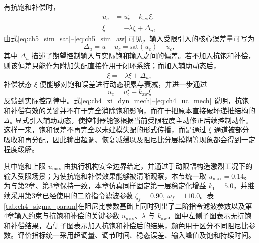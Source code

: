有抗饱和补偿时，
\begin{subequations}\label{eq:ch5_sim_aw}
\begin{align}
u_c&=u_c^\star-k_{\mathrm{aw}}\xi,\\
\dot\xi&=-\lambda\xi+\Delta_u,
\end{align}
\end{subequations}
由式\eqref{eq:ch5_sim_sat}--\eqref{eq:ch5_sim_aw} 可见，输入受限引入的核心误差量可写为
\begin{equation}\label{eq:ch4_delta_u}
\Delta_u=u-u_c=\mathrm{sat}(u_c)-u_c,
\end{equation}
其中 $\Delta_u$ 描述了期望控制输入与实际饱和输入之间的偏差。若不加入抗饱和补偿，则该偏差只能作为附加失配直接作用于闭环系统；而加入辅助动态后，
\begin{equation}\label{eq:ch4_xi_dyn_mech}
\dot\xi=-\lambda\xi+\Delta_u,
\end{equation}
补偿状态 $\xi$ 便能够对饱和误差进行动态积累与衰减，并进一步通过
\begin{equation}\label{eq:ch4_uc_mech}
u_c=u_c^\star-k_{\mathrm{aw}}\xi
\end{equation}
反馈到实际控制律中。式\eqref{eq:ch4_xi_dyn_mech}--\eqref{eq:ch4_uc_mech} 说明，抗饱和补偿有效的关键并不在于完全消除饱和影响，而在于把原本直接破坏递推结构的 $\Delta_u$ 显式引入辅助动态，使控制器能够根据当前受限程度主动修正后续控制动作。这样一来，饱和误差不再完全以未建模失配的形式传播，而是通过 $\xi$ 通道被部分吸收和再分配，因此输出超调、恢复减缓以及阻尼比分层模糊等现象都会得到一定程度缓解。

其中饱和上限 $u_{\max}$ 由执行机构安全边界给定，并通过手动限幅构造激烈工况下的输入受限场景；为使抗饱和补偿效果能够被清晰观察，本节统一取 $u_{\max}=0.14$。为与第2章、第3章保持一致，本章仿真同样固定第一层稳定化增益 $k_1=5.0$，并继续采用第3章已经使用的二阶指令滤波参数 $\zeta_f=0.90,\ \omega_f=110.0$。表\ref{tab:ch4_sigma_param}在阻尼比参数基础上同时列出了二阶指令滤波参数以及第4章输入约束与抗饱和补偿的关键参数 $u_{\max}$、$\lambda$ 与 $k_{\mathrm{aw}}$。图中左侧子图表示无抗饱和补偿结果，右侧子图表示加入抗饱和补偿后的结果，颜色用于区分不同阻尼比参数。评价指标统一采用超调量、调节时间、稳态误差、输入峰值及饱和持续时间。

